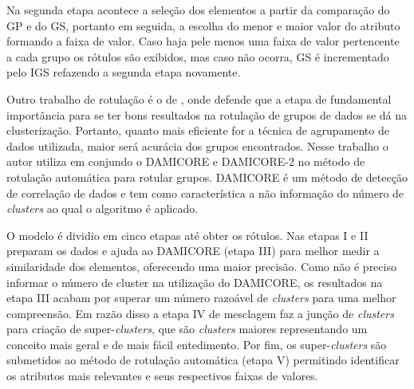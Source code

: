Na segunda etapa acontece a seleção dos elementos a partir da comparação do GP e do GS, portanto em seguida, a escolha do menor e maior valor do atributo formando a faixa de valor. Caso haja pele menos uma faixa de valor pertencente a cada grupo os rótulos são exibidos, mas caso não ocorra, GS é incrementado pelo IGS refazendo a segunda etapa novamente. 

Outro trabalho de rotulação é o de \cite{Araujo2018}, onde defende que a etapa de fundamental importância para se ter bons resultados na rotulação de grupos de dados se dá na clusterização. Portanto, quanto mais eficiente for a técnica de agrupamento de dados utilizada, maior será  acurácia dos grupos encontrados.
Nesse trabalho o autor utiliza em conjundo o DAMICORE e DAMICORE-2 no método de rotulação automática para rotular  grupos. DAMICORE é um método de detecção de correlação de dados e tem como característica a não informação do número de \textit{clusters} ao qual o algoritmo é aplicado. 

O modelo é dividio em cinco etapas até obter os rótulos. Nas etapas I e II preparam os dados e ajuda ao DAMICORE (etapa III) para melhor medir a similaridade dos elementos, oferecendo uma maior precisão. Como não é preciso informar o número de cluster na utilização do DAMICORE, os resultados na etapa III acabam por superar um número razoável de \textit{clusters} para uma melhor compreensão. Em razão disso a etapa IV de mesclagem faz a junção de \textit{clusters} para criação de super-\textit{clusters}, que são \textit{clusters} maiores representando um conceito mais geral e de mais fácil entedimento. Por fim, os super-\textit{clusters} são submetidos ao método de rotulação automática (etapa V) permitindo identificar os atributos mais relevantes e seus respectivos faixas de valores.

